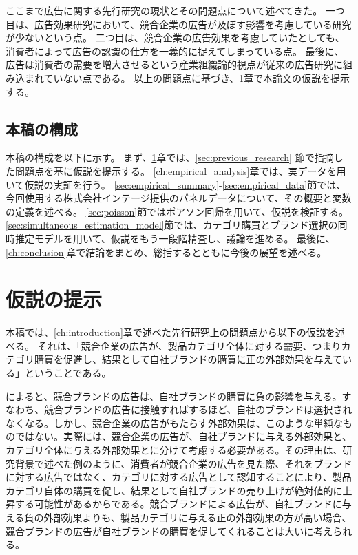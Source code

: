 \documentclass[11pt]{jsarticle}
\begin{document}
ここまで広告に関する先行研究の現状とその問題点について述べてきた。
一つ目は、広告効果研究において、競合企業の広告が及ぼす影響を考慮している研究が少ないという点。
二つ目は、競合企業の広告効果を考慮していたとしても、消費者によって広告の認識の仕方を一義的に捉えてしまっている点。
最後に、広告は消費者の需要を増大させるという産業組織論的視点が従来の広告研究に組み込まれていない点である。
以上の問題点に基づき、\ref{ch:hypothesis}章で本論文の仮説を提示する。


\subsection{本稿の構成}
\label{sec:constitution}
本稿の構成を以下に示す。
まず、\ref{ch:hypothesis}章では、\ref{sec:previous_research} 節で指摘した問題点を基に仮説を提示する。
\ref{ch:empirical_analysis}章では、実データを用いて仮説の実証を行う。
\ref{sec:empirical_summary}-\ref{sec:empirical_data}節では、今回使用する株式会社インテージ提供のパネルデータについて、その概要と変数の定義を述べる。
\ref{sec:poisson}節ではポアソン回帰を用いて、仮説を検証する。
\ref{sec:simultaneous_estimation_model}節では、カテゴリ購買とブランド選択の同時推定モデルを用いて、仮説をもう一段階精査し、議論を進める。
最後に、\ref{ch:conclusion}章で結論をまとめ、総括するとともに今後の展望を述べる。

\section{仮説の提示}
\label{ch:hypothesis}
本稿では、\ref{ch:introduction}章で述べた先行研究上の問題点から以下の仮説を述べる。
それは、「競合企業の広告が、製品カテゴリ全体に対する需要、つまりカテゴリ購買を促進し、結果として自社ブランドの購買に正の外部効果を与えている」ということである。

\citet{shimizu1990}によると、競合ブランドの広告は、自社ブランドの購買に負の影響を与える。すなわち、競合ブランドの広告に接触すればするほど、自社のブランドは選択されなくなる。しかし、競合企業の広告がもたらす外部効果は、このような単純なものではない。実際には、競合企業の広告が、自社ブランドに与える外部効果と、カテゴリ全体に与える外部効果とに分けて考慮する必要がある。その理由は、研究背景で述べた例のように、消費者が競合企業の広告を見た際、それをブランドに対する広告ではなく、カテゴリに対する広告として認知することにより、製品カテゴリ自体の購買を促し、結果として自社ブランドの売り上げが絶対値的に上昇する可能性があるからである。競合ブランドによる広告が、自社ブランドに与える負の外部効果よりも、製品カテゴリに与える正の外部効果の方が高い場合、競合ブランドの広告が自社ブランドの購買を促してくれることは大いに考えられる。
\end{document}
